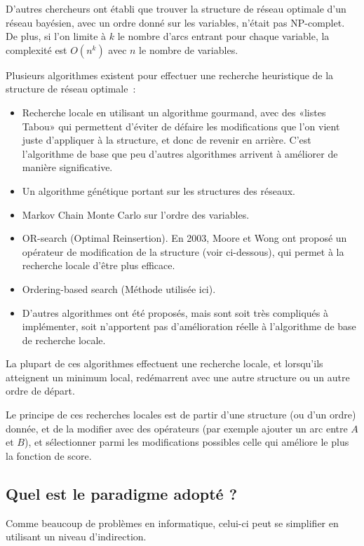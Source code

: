 \documentclass[french,a4paper]{article}
\begin{document}
D'autres chercheurs ont établi que trouver la structure de réseau
optimale d'un réseau bayésien, avec un ordre donné sur les variables,
n'était pas NP-complet. De plus, si l'on limite à $k$ le nombre d'arcs
entrant pour chaque variable, la complexité est $O(n^k)$ avec $n$ le
nombre de variables.

Plusieurs algorithmes existent pour effectuer une recherche
heuristique de la structure de réseau optimale~:
\begin{itemize}
\item Recherche locale en utilisant un algorithme gourmand, avec des
  «listes Tabou» qui permettent d'éviter de défaire les modifications
  que l'on vient juste d'appliquer à la structure, et donc de revenir
  en arrière. C'est l'algorithme de base que peu d'autres algorithmes
  arrivent à améliorer de manière significative.
\item Un algorithme génétique portant sur les structures des réseaux.
\item Markov Chain Monte Carlo sur l'ordre des variables.
\item OR-search (Optimal Reinsertion). En 2003, Moore et Wong ont
  proposé un opérateur de modification de la structure (voir
  ci-dessous), qui permet à la recherche locale d'être plus efficace.
\item Ordering-based search (Méthode utilisée ici).
\item D'autres algorithmes ont été proposés, mais sont soit très
  compliqués à implémenter, soit n'apportent pas d'amélioration réelle
  à l'algorithme de base de recherche locale.
\end{itemize}

La plupart de ces algorithmes effectuent une recherche locale, et
lorsqu'ils atteignent un minimum local, redémarrent avec une autre
structure ou un autre ordre de départ.

Le principe de ces recherches locales est de partir d'une structure
(ou d'un ordre) donnée, et de la modifier avec des opérateurs (par
exemple ajouter un arc entre $A$ et $B$), et sélectionner parmi les
modifications possibles celle qui améliore le plus la fonction de
score.

\subsection{Quel est le paradigme adopté ?}
Comme beaucoup de problèmes en informatique, celui-ci peut se
simplifier en utilisant un niveau d'indirection.
\end{document}
